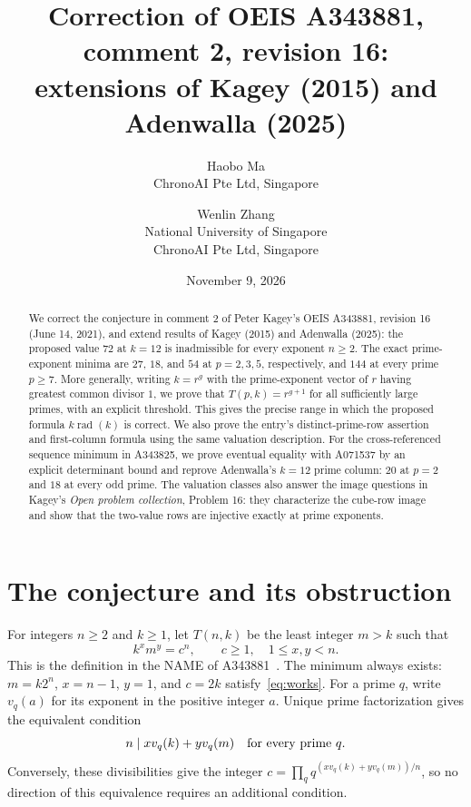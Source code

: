 \documentclass[11pt]{article}
\title{Correction of OEIS A343881, comment 2, revision 16:\\
extensions of Kagey (2015) and Adenwalla (2025)}
\author{Haobo Ma\\\small ChronoAI Pte Ltd, Singapore
\and Wenlin Zhang\\\small National University of Singapore\\\small ChronoAI Pte Ltd, Singapore}
\date{November 9, 2026}
\DeclareMathOperator{\rad}{rad}
\begin{document}
\maketitle
\begin{abstract}
We correct the conjecture in comment 2 of Peter Kagey's OEIS A343881,
revision 16 (June 14, 2021), and extend results of Kagey (2015) and
Adenwalla (2025): the proposed value $72$ at $k=12$ is inadmissible
for every exponent $n\ge2$.
The exact prime-exponent minima are $27$, $18$, and $54$ at $p=2,3,5$,
respectively, and $144$ at every prime $p\ge7$.
More generally, writing $k=r^g$ with the prime-exponent vector of $r$
having greatest common divisor $1$, we prove that $T(p,k)=r^{g+1}$ for
all sufficiently large primes, with an explicit threshold.
This gives the precise range in which the proposed formula $k\rad(k)$
is correct. We also prove the entry's distinct-prime-row assertion and
first-column formula using the same valuation description. For the
cross-referenced sequence minimum in A343825, we prove eventual equality
with A071537 by an explicit determinant bound and reprove Adenwalla's
$k=12$ prime column: $20$ at $p=2$ and $18$ at every odd prime.
The valuation classes also answer the image questions in Kagey's
\emph{Open problem collection}, Problem 16: they characterize the cube-row
image and show that the two-value rows are injective exactly at prime exponents.
\end{abstract}

\section{The conjecture and its obstruction}
For integers $n\ge2$ and $k\ge1$, let $T(n,k)$ be the least integer $m>k$
such that
\begin{equation}\label{eq:works}
 k^x m^y=c^n,\qquad c\ge1,\quad 1\le x,y<n.
\end{equation}
This is the definition in the NAME of A343881~\cite{a343881}.
The minimum always exists: $m=k2^n$, $x=n-1$, $y=1$, and $c=2k$
satisfy~\eqref{eq:works}. For a prime $q$, write $v_q(a)$ for its
exponent in the positive integer $a$. Unique prime factorization gives
the equivalent condition
\begin{equation}\label{eq:valuation}
 n\mid x v_q(k)+y v_q(m)\quad\hbox{for every prime }q.
\end{equation}
Conversely, these divisibilities give the integer
$c=\prod_q q^{(xv_q(k)+yv_q(m))/n}$, so no direction of this equivalence
requires an additional condition.
\end{document}

